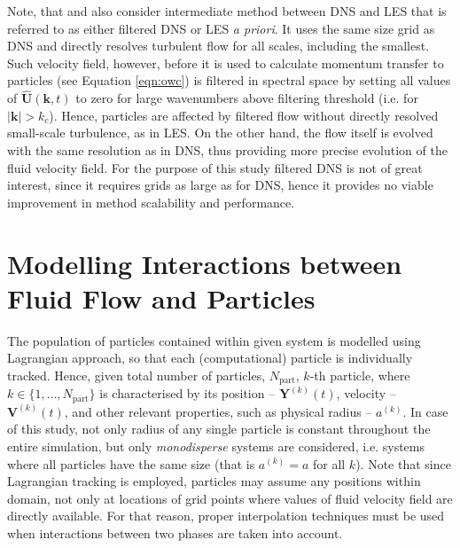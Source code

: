 \documentclass{pracamgren}
\begin{document}
\medskip

Note, that \textcite{Jin2010} and \textcite{Rosa2017} also consider intermediate method between DNS and LES that is referred to as either filtered DNS or LES \emph{a priori}.
It uses the same size grid as DNS and directly resolves turbulent flow for all scales, including the smallest.
Such velocity field, however, before it is used to calculate momentum transfer to particles (see Equation \ref{eqn:owc}) is filtered in spectral space by setting all values of $\hat{\mathbf{U}}(\mathbf{k}, t)$ to zero for large wavenumbers above filtering threshold (i.e. for $|\mathbf{k}| > k_c$).
Hence, particles are affected by filtered flow without directly resolved small-scale turbulence, as in LES.
On the other hand, the flow itself is evolved with the same resolution as in DNS, thus providing more precise evolution of the fluid velocity field.
For the purpose of this study filtered DNS is not of great interest, since it requires grids as large as for DNS, hence it provides no viable improvement in method scalability and performance.
   

\section{Modelling Interactions between Fluid Flow and Particles}
\label{sc:ch1.part}

The population of particles contained within given system is modelled using Lagrangian approach, so that each (computational) particle is individually tracked.
Hence, given total number of particles, $N_{\text{part}}$, $k$-th particle, where $k \in \{ 1, \ldots , N_{\text{part}} \}$ is characterised by its position -- $\mathbf{Y}^{(k)}(t)$, velocity -- $\mathbf{V}^{(k)}(t)$, and other relevant properties, such as physical radius -- $a^{(k)}$.
In case of this study, not only radius of any single particle is constant throughout the entire simulation, but only \emph{monodisperse} systems are considered, i.e. systems where all particles have the same size (that is $a^{(k)} = a$ for all $k$).
Note that since Lagrangian tracking is employed, particles may assume any positions within domain, not only at locations of grid points where values of fluid velocity field are directly available.
For that reason, proper interpolation techniques must be used when interactions between two phases are taken into account.
\end{document}
